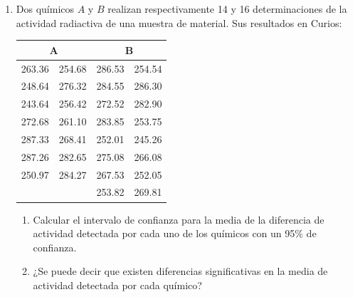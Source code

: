 \documentclass[a4paper]{article}
\begin{document}
\begin{enumerate}[leftmargin=*]
\item Dos químicos $A$ y $B$ realizan respectivamente 14 y 16 determinaciones de la actividad radiactiva de una muestra de material. Sus resultados en Curios:
\begin{center}
\begin{tabular}{ll|ll}
\multicolumn{2}{c|}{A} & \multicolumn{2}{c}{B} \\
\hline
263.36 & 254.68 & 286.53 & 254.54 \\
248.64 & 276.32 & 284.55 & 286.30 \\
243.64 & 256.42 & 272.52 & 282.90 \\
272.68 & 261.10 & 283.85 & 253.75 \\
287.33 & 268.41 & 252.01 & 245.26 \\
287.26 & 282.65 & 275.08 & 266.08 \\
250.97 & 284.27 & 267.53 & 252.05 \\
 &  & 253.82 & 269.81 \\
\end{tabular}
\end{center}
\begin{enumerate}
\item  Calcular el intervalo de confianza para la media de la
diferencia de actividad detectada por cada uno de los químicos con
un 95\% de confianza.

\item ¿Se puede decir que existen diferencias significativas en la
media de actividad detectada por cada químico?
\end{enumerate}

\end{enumerate}
\end{document}
